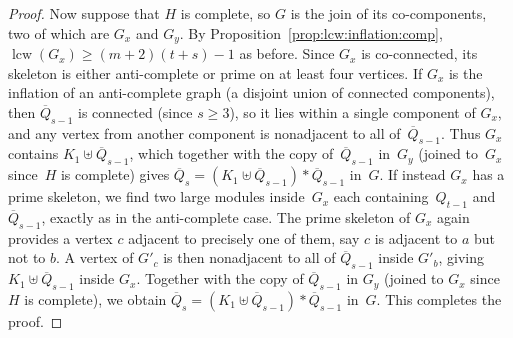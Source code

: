 \documentclass[10pt,a4paper]{amsart}
\newcommand{\lcw}{\operatorname{lcw}}
\begin{document}
\begin{proof}
%
%
%

Now suppose that $H$ is complete, so $G$ is the join of its co-components, two of which are $G_x$ and $G_y$. By Proposition~\ref{prop:lcw:inflation:comp}, $\lcw(G_x)\ge (m+2)(t+s)-1$ as before. Since $G_x$ is co-connected, its skeleton is either anti-complete or prime on at least four vertices. If $G_x$ is the inflation of an anti-complete graph (a disjoint union of connected components), then $\overline{Q}_{s-1}$ is connected (since $s\ge 3$), so it lies within a single component of $G_x$, and any vertex from another component is nonadjacent to all of~$\overline{Q}_{s-1}$. Thus $G_x$ contains $K_1\uplus\overline{Q}_{s-1}$, which together with the copy of~$\overline{Q}_{s-1}$ in~$G_y$ (joined to~$G_x$ since~$H$ is complete) gives $\overline{Q}_s=(K_1\uplus\overline{Q}_{s-1})\ast\overline{Q}_{s-1}$ in~$G$. If instead $G_x$ has a prime skeleton, we find two large modules inside~$G_x$ each containing~$Q_{t-1}$ and~$\overline{Q}_{s-1}$, exactly as in the anti-complete case. The prime skeleton of $G_x$ again provides a vertex $c$ adjacent to precisely one of them, say $c$ is adjacent to $a$ but not to $b$. A vertex of $G'_c$ is then nonadjacent to all of $\overline{Q}_{s-1}$ inside $G'_b$, giving $K_1\uplus\overline{Q}_{s-1}$ inside $G_x$. Together with the copy of $\overline{Q}_{s-1}$ in $G_y$ (joined to $G_x$ since $H$ is complete), we obtain $\overline{Q}_s=(K_1\uplus\overline{Q}_{s-1})\ast\overline{Q}_{s-1}$ in~$G$. This completes the proof.
\end{proof}
\end{document}
